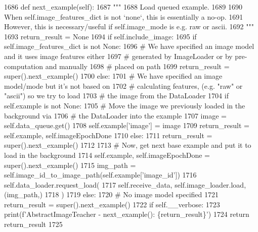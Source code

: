 \begin{DoxyCode}
1686     \textcolor{keyword}{def }next\_example(self):
1687         \textcolor{stringliteral}{"""}
1688 \textcolor{stringliteral}{        Load queued example.}
1689 \textcolor{stringliteral}{}
1690 \textcolor{stringliteral}{        When self.image\_features\_dict is not `none`, this is essentially a no-op.}
1691 \textcolor{stringliteral}{        However, this is necessary/useful if self.image\_mode is e.g. raw or ascii.}
1692 \textcolor{stringliteral}{        """}
1693         return\_result = \textcolor{keywordtype}{None}
1694         \textcolor{keywordflow}{if} self.include\_image:
1695             \textcolor{keywordflow}{if} self.image\_features\_dict \textcolor{keywordflow}{is} \textcolor{keywordflow}{not} \textcolor{keywordtype}{None}:
1696                 \textcolor{comment}{# We have specified an image model and it uses image features either}
1697                 \textcolor{comment}{# generated by ImageLoader or by pre-computation and manually}
1698                 \textcolor{comment}{# placed on path}
1699                 return\_result = super().next\_example()
1700             \textcolor{keywordflow}{else}:
1701                 \textcolor{comment}{# We have specified an image model/mode but it's not based on}
1702                 \textcolor{comment}{# calculating features, (e.g. "raw" or "ascii") so we try to load}
1703                 \textcolor{comment}{# the image from the DataLoader}
1704                 \textcolor{keywordflow}{if} self.example \textcolor{keywordflow}{is} \textcolor{keywordflow}{not} \textcolor{keywordtype}{None}:
1705                     \textcolor{comment}{# Move the image we previously loaded in the background via}
1706                     \textcolor{comment}{# the DataLoader into the example}
1707                     image = self.data\_queue.get()
1708                     self.example[\textcolor{stringliteral}{'image'}] = image
1709                     return\_result = self.example, self.imageEpochDone
1710                 \textcolor{keywordflow}{else}:
1711                     return\_result = super().next\_example()
1712 
1713                 \textcolor{comment}{# Now, get next base example and put it to load in the background}
1714                 self.example, self.imageEpochDone = super().next\_example()
1715                 img\_path = self.image\_id\_to\_image\_path(self.example[\textcolor{stringliteral}{'image\_id'}])
1716                 self.data\_loader.request\_load(
1717                     self.receive\_data, self.image\_loader.load, (img\_path,)
1718                 )
1719         \textcolor{keywordflow}{else}:
1720             \textcolor{comment}{# No image model specified}
1721             return\_result = super().next\_example()
1722         \textcolor{keywordflow}{if} self.\_\_verbose:
1723             print(f\textcolor{stringliteral}{'AbstractImageTeacher - next\_example(): \{return\_result\}'})
1724         \textcolor{keywordflow}{return} return\_result
1725 
\end{DoxyCode}
